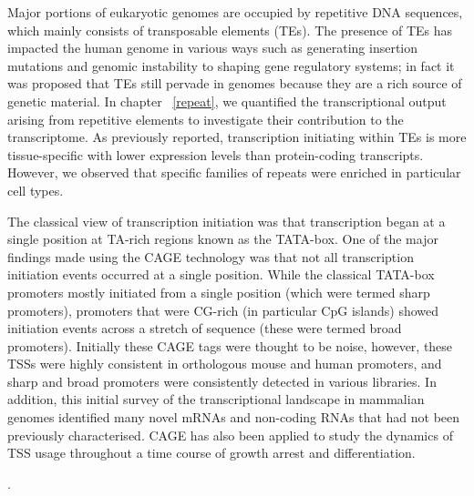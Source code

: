 Major portions of eukaryotic genomes are occupied by repetitive DNA sequences, which mainly consists of transposable elements (TEs). The presence of TEs has impacted the human genome in various ways such as generating insertion mutations and genomic instability\cite{pmid19763152,pmid11700292} to shaping gene regulatory systems\cite{pmid18368054}; in fact it was proposed that TEs still pervade in genomes because they are a rich source of genetic material\cite{pmid18368054}. In chapter ~\ref{repeat}, we quantified the transcriptional output arising from repetitive elements to investigate their contribution to the transcriptome. As previously reported, transcription initiating within TEs is more tissue-specific with lower expression levels than protein-coding transcripts\cite{pmid19377475}. However, we observed that specific families of repeats were enriched in particular cell types.

The classical view of transcription initiation was that transcription began at a single position at TA-rich regions known as the TATA-box. One of the major findings made using the CAGE technology was that not all transcription initiation events occurred at a single position\cite{pmid16645617}. While the classical TATA-box promoters mostly initiated from a single position (which were termed sharp promoters), promoters that were CG-rich (in particular CpG islands) showed initiation events across a stretch of sequence (these were termed broad promoters). Initially these CAGE tags were thought to be noise, however, these TSSs were highly consistent in orthologous mouse and human promoters, and sharp and broad promoters were consistently detected in various libraries\cite{pmid16645617}. In addition, this initial survey of the transcriptional landscape in mammalian genomes identified many novel mRNAs and non-coding RNAs that had not been previously characterised\cite{pmid16141072}. CAGE has also been applied to study the dynamics of TSS usage throughout a time course of growth arrest and differentiation\cite{pmid19377474}.

\cite{pmid25218058}.

